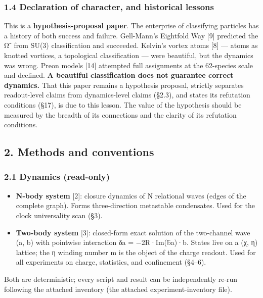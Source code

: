 \documentclass[
]{article}
\providecommand{\tightlist}{%
  \setlength{\itemsep}{0pt}\setlength{\parskip}{0pt}}
\begin{document}
\subsubsection{1.4 Declaration of character, and historical
lessons}\label{declaration-of-character-and-historical-lessons}

This is a \textbf{hypothesis-proposal paper}. The enterprise of
classifying particles has a history of both success and failure.
Gell-Mann's Eightfold Way {[}9{]} predicted the Ω⁻ from SU(3)
classification and succeeded. Kelvin's vortex atoms {[}8{]} --- atoms as
knotted vortices, a topological classification --- were beautiful, but
the dynamics was wrong. Preon models {[}14{]} attempted full assignments
at the 62-species scale and declined. \textbf{A beautiful classification
does not guarantee correct dynamics.} That this paper remains a
hypothesis proposal, strictly separates readout-level claims from
dynamics-level claims (§2.3), and states its refutation conditions
(§17), is due to this lesson. The value of the hypothesis should be
measured by the breadth of its connections and the clarity of its
refutation conditions.

\subsection{2. Methods and conventions}\label{methods-and-conventions}

\subsubsection{2.1 Dynamics (read-only)}\label{dynamics-read-only}

\begin{itemize}
\tightlist
\item
  \textbf{N-body system} {[}2{]}: closure dynamics of N relational waves
  (edges of the complete graph). Forms three-direction metastable
  condensates. Used for the clock universality scan (§3).
\item
  \textbf{Two-body system} {[}3{]}: closed-form exact solution of the
  two-channel wave (a, b) with pointwise interaction δa = −2R·Im(b̄a)·b.
  States live on a (χ, η) lattice; the η winding number m is the object
  of the charge readout. Used for all experiments on charge, statistics,
  and confinement (§4--6).
\end{itemize}

Both are deterministic; every script and result can be independently
re-run following the attached inventory (the attached
experiment-inventory file).
\end{document}
